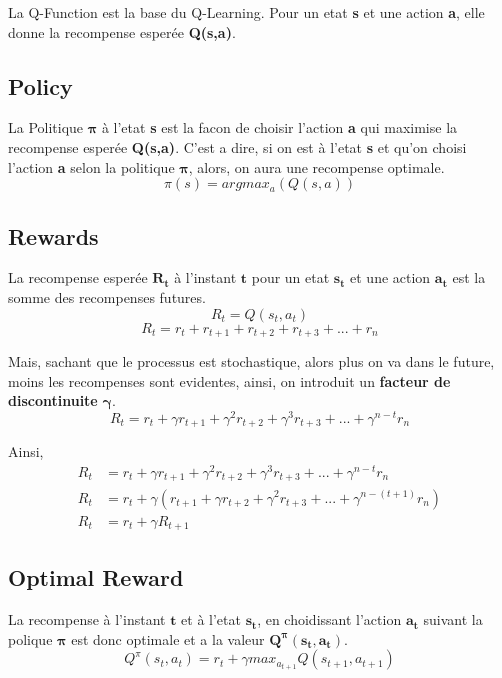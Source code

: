 \documentclass{article}
\begin{document}
La Q-Function est la base du Q-Learning. Pour un etat \textbf{s} et une action \textbf{a}, elle donne la recompense esperée \textbf{Q(s,a)}.

\subsection{Policy}

La Politique $\boldsymbol{\pi}$ à l'etat \textbf{s} est la facon de choisir l'action \textbf{a} qui maximise la recompense esperée \textbf{Q(s,a)}. C'est a dire, si on est à l'etat \textbf{s} et qu'on choisi l'action \textbf{a} selon la politique $\boldsymbol{\pi}$, alors, on aura une recompense optimale.
$$\pi(s)=argmax_a(Q(s,a))$$

\subsection{Rewards}

La recompense esperée $\boldsymbol{R_t}$ à l'instant $\textbf{t}$ pour un etat $\boldsymbol{s_t}$ et une action $\boldsymbol{a_t}$ est la somme des recompenses futures.
$$R_t=Q(s_t,a_t)$$
$$R_t=r_t+r_{t+1}+r_{t+2}+r_{t+3}+...+r_n$$

Mais, sachant que le processus est stochastique, alors plus on va dans le future, moins les recompenses sont evidentes, ainsi, on introduit un \textbf{facteur de discontinuite} $\boldsymbol{\gamma}$.  
$$R_t=r_t+{\gamma}r_{t+1}+{\gamma^2}r_{t+2}+{\gamma^3}r_{t+3}+...+{\gamma^{n-t}}r_n$$

Ainsi,
\begin{equation}
\begin{split}
R_t&=r_t+{\gamma}r_{t+1}+{\gamma^2}r_{t+2}+{\gamma^3}r_{t+3}+...+{\gamma^{n-t}}r_n \\
R_t&=r_t+{\gamma}(r_{t+1}+{\gamma}r_{t+2}+{\gamma^2}r_{t+3}+...+{\gamma^{n-(t+1)}}r_n) \\
R_t&=r_t+{\gamma}R_{t+1}
\end{split}
\end{equation}

\subsection{Optimal Reward}

La recompense à l'instant $\textbf{t}$ et à l'etat $\boldsymbol{s_t}$, en choidissant l'action $\boldsymbol{a_t}$ suivant la polique $\boldsymbol{\pi}$ est donc optimale et a la valeur $\boldsymbol{Q^{\pi}(s_t,a_t)}$.
$$Q^{\pi}(s_t,a_t)=r_t+{\gamma}max_{a_{t+1}}{Q(s_{t+1},a_{t+1})}$$
\end{document}
